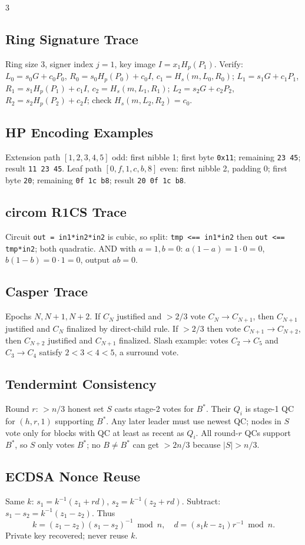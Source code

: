 \documentclass[8pt]{extarticle}
\begin{document}
\begin{multicols*}{3}
\subsection{Ring Signature Trace}
Ring size 3, signer index $j=1$, key image $I=x_1H_p(P_1)$. Verify: $L_0=s_0G+c_0P_0$, $R_0=s_0H_p(P_0)+c_0I$, $c_1=H_s(m,L_0,R_0)$; $L_1=s_1G+c_1P_1$, $R_1=s_1H_p(P_1)+c_1I$, $c_2=H_s(m,L_1,R_1)$; $L_2=s_2G+c_2P_2$, $R_2=s_2H_p(P_2)+c_2I$; check $H_s(m,L_2,R_2)=c_0$.

\subsection{HP Encoding Examples}
Extension path $[1,2,3,4,5]$ odd: first nibble 1; first byte \texttt{0x11}; remaining \texttt{23 45}; result \texttt{11 23 45}. Leaf path $[0,f,1,c,b,8]$ even: first nibble 2, padding 0; first byte \texttt{20}; remaining \texttt{0f 1c b8}; result \texttt{20 0f 1c b8}.

\subsection{circom R1CS Trace}
Circuit \texttt{out = in1*in2*in2} is cubic, so split: \texttt{tmp <== in1*in2} then \texttt{out <== tmp*in2}; both quadratic. AND with $a=1,b=0$: $a(1-a)=1\cdot0=0$, $b(1-b)=0\cdot1=0$, output $a b=0$.

\subsection{Casper Trace}
Epochs $N,N+1,N+2$. If $C_N$ justified and $>2/3$ vote $C_N\to C_{N+1}$, then $C_{N+1}$ justified and $C_N$ finalized by direct-child rule. If $>2/3$ then vote $C_{N+1}\to C_{N+2}$, then $C_{N+2}$ justified and $C_{N+1}$ finalized. Slash example: votes $C_2\to C_5$ and $C_3\to C_4$ satisfy $2<3<4<5$, a surround vote.

\subsection{Tendermint Consistency}
Round $r$: $>n/3$ honest set $S$ casts stage-2 votes for $B^*$. Their $Q_i$ is stage-1 QC for $(h,r,1)$ supporting $B^*$. Any later leader must use newest QC; nodes in $S$ vote only for blocks with QC at least as recent as $Q_i$. All round-$r$ QCs support $B^*$, so $S$ only votes $B^*$; no $B\ne B^*$ can get $>2n/3$ because $|S|>n/3$.

\subsection{ECDSA Nonce Reuse}
Same $k$: $s_1=k^{-1}(z_1+rd)$, $s_2=k^{-1}(z_2+rd)$. Subtract: $s_1-s_2=k^{-1}(z_1-z_2)$. Thus
\[
k=(z_1-z_2)(s_1-s_2)^{-1}\bmod n,\quad d=(s_1k-z_1)r^{-1}\bmod n.
\]
Private key recovered; never reuse $k$.


\end{multicols*}
\end{document}
